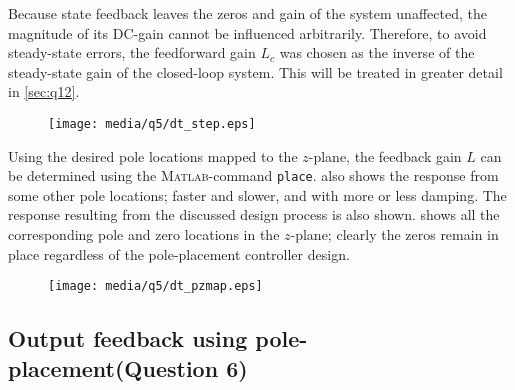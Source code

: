 Because state feedback leaves the zeros and gain of the system unaffected, the magnitude of its DC-gain cannot be influenced arbitrarily. Therefore, to avoid steady-state errors, the feedforward gain $L_c$ was chosen as the inverse of the steady-state gain of the closed-loop system. This will be treated in greater detail in \cref{sec:q12}.
\begin{figure}[ht]
    \centering
    \texttt{[image: media/q5/dt\_step.eps]}
    \caption{}
    \label{fig:q5_step}
\end{figure}
Using the desired pole locations mapped to the $z$-plane, the feedback gain $L$ can be determined using the \textsc{Matlab}-command \texttt{place}.  also shows the response from some other pole locations; faster and slower, and with more or less damping. The response resulting from the discussed design process is also shown.  shows all the corresponding pole and zero locations in the $z$-plane; clearly the zeros remain in place regardless of the pole-placement controller design.
\begin{figure}[ht]
    \centering
    \texttt{[image: media/q5/dt\_pzmap.eps]}
    \caption{}
    \label{fig:q5_pzmap}
\end{figure}

\subsection{Output feedback using pole-placement\textnormal{\phantom{xxx}(Question 6)}}
\label{sec:ss_output}
